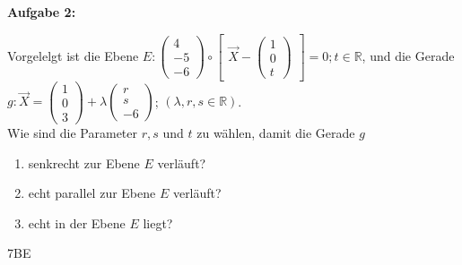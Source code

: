 \documentclass[a4paper,12pt]{article}
\newcommand{\Aufgabe}[1]{
  {
  \vspace*{0.5cm}
  \textsf{\textbf{Aufgabe #1}}
  \vspace*{0.2cm}
  
  }
}
\begin{document}
\Aufgabe{2:}
Vorgelelgt ist die Ebene $E:\begin{pmatrix}4\\-5\\-6 \end{pmatrix}\circ
  \begin{bmatrix}\vec{X}-\begin{pmatrix}1\\0\\t\end{pmatrix}\end{bmatrix} = 0; t\in\mathbb{R}$,
  und die Gerade $g: \vec{X} = \begin{pmatrix}1 \\ 0 \\3 \end{pmatrix}
                     + \lambda \begin{pmatrix}r \\ s \\-6 \end{pmatrix}$;
                       $(\lambda, r, s \in \mathbb{R})$.\\
Wie sind die Parameter $r, s$ und $t$ zu wählen, damit die Gerade $g$
\begin{enumerate}[label={\alph*)}]
\item senkrecht zur Ebene $E$ verläuft?
\item echt parallel zur Ebene $E$ verläuft?
\item echt in der Ebene  $E$ liegt? 
\end{enumerate}

\begin{flushright}7BE \end{flushright}



\end{document}

